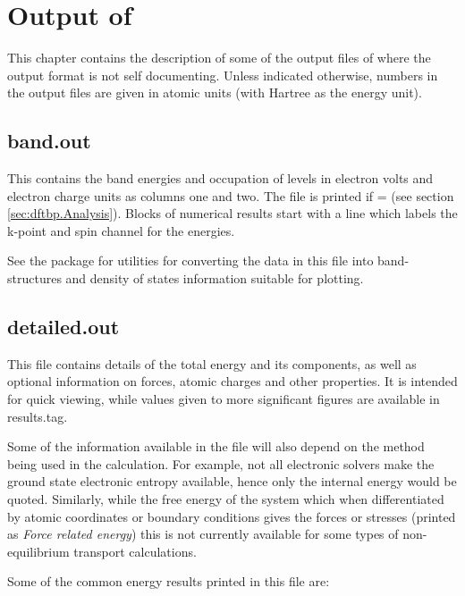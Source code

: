 \chapter{Output of \dftbp}
\label{sec:dftbp.output}

This chapter contains the description of some of the output files of
\dftbp{} where the output format is not self documenting. Unless
indicated otherwise, numbers in the output files are given in atomic
units (with Hartree as the energy unit).

\section{band.out}
\label{sec:dftbp.bandout}

This contains the band energies and occupation of levels in electron volts and
electron charge units as columns one and two. The file is printed if
 =  (see section \ref{sec:dftbp.Analysis}). Blocks of
numerical results start with a line which labels the k-point and spin channel
for the energies.

See the \dptools{} package for utilities for converting the data in this file
into band-structures and density of states information suitable for plotting.

\section{detailed.out}
\label{sec:dftbp.detailedout}

This file contains details of the total energy and its components, as well as
optional information on forces, atomic charges and other properties. It is
intended for quick viewing, while values given to more significant figures are
available in results.tag.

Some of the information available in the file will also depend on the method
being used in the calculation. For example, not all electronic solvers make the
ground state electronic entropy available, hence only the internal energy would
be quoted. Similarly, while the free energy of the system which when
differentiated by atomic coordinates or boundary conditions gives the forces or
stresses (printed as \textit{Force related energy}) this is not currently
available for some types of non-equilibrium transport calculations.

Some of the common energy results printed in this file are:\\

